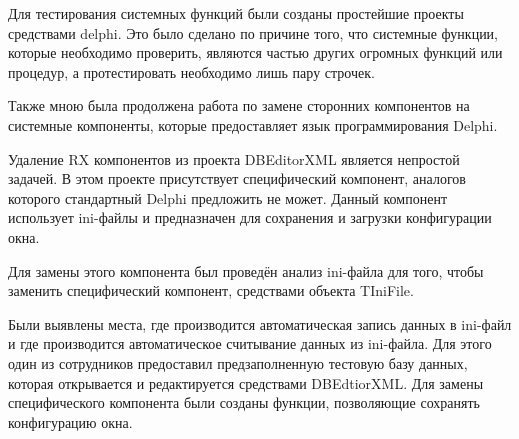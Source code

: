 {    \par \redline Для тестирования системных функций были созданы простейшие проекты средствами delphi. Это было сделано по причине того, что системные функции, которые необходимо проверить, являются частью других огромных функций или процедур, а протестировать необходимо лишь пару строчек. 

    \par \redline Также мною была продолжена работа по замене сторонних компонентов на системные компоненты, которые предоставляет язык программирования Delphi. 

    \par \redline Удаление RX компонентов из проекта DBEditorXML является непростой задачей. В этом проекте присутствует специфический компонент, аналогов которого стандартный Delphi предложить не может. Данный компонент использует ini-файлы и предназначен для сохранения и загрузки конфигурации окна. 

    \par \redline Для замены этого компонента был проведён анализ ini-файла для того, чтобы заменить специфический компонент, средствами объекта TIniFile.   

    \par \redline Были выявлены места, где производится автоматическая запись данных в ini-файл и где производится автоматическое считывание данных из ini-файла. Для этого один из сотрудников предоставил предзаполненную тестовую базу данных, которая открывается и редактируется средствами DBEdtiorXML. Для замены специфического компонента были созданы функции, позволяющие сохранять конфигурацию окна. 

    \par
}